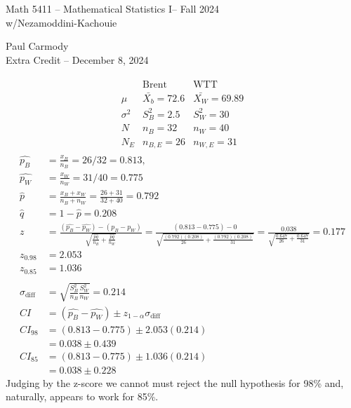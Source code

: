 \documentclass[10pt,a4paper]{report}
\newcommand{\CLASSNAME}{Math 5411 -- Mathematical Statistics I}
\newcommand{\PROFESSOR}{Nezamoddini-Kachouie}
\newcommand{\STUDENTNAME}{Paul Carmody}
\newcommand{\ASSIGNMENT}{Extra Credit }
\newcommand{\DUEDATE}{December 8, 2024}
\newcommand{\SEMESTER}{Fall 2024}
\begin{document}
\begin{center}
	\Large{\CLASSNAME -- \SEMESTER} \\
	\large{w/\PROFESSOR}
\end{center}
\begin{center}
	\STUDENTNAME \\
	\ASSIGNMENT -- \DUEDATE\\
\end{center}

\begin{align*}
	\begin{array}{l|c|c}
	& \text{Brent} & \text{WTT} \\
	\mu & \bar{X_b} = 72.6 & \bar{X_W} = 69.89 \\
	\sigma^2 & S_B^2 = 2.5 & S_W^2 = 30 \\
	N & n_B = 32 & n_W = 40 \\
	N_E & n_{B,E} = 26 & n_{W,E} = 31
	\end{array}
\end{align*}\begin{align*}
	\hat{p_B}&=\frac{x_B}{n_B} = 26/32=0.813,\\ \hat{p_W} &= \frac{x_W}{n_W}=31/40=0.775 \\
	\hat{p} &= \frac{x_B+x_W}{n_B+n_W} = \frac{26+31}{32+40} = 0.792\\
	\hat{q} &= 1-\hat{p} = 0.208\\
	z &= \frac{(\hat{p_B}-\hat{p_W})-(p_B-p_W)}{\sqrt{\frac{\hat{p}\hat{q}}{n_B}+\frac{\hat{p}\hat{q}}{n_W}}} = \frac{(0.813-0.775)-0}{\sqrt{\frac{(0.792)(0.208)}{26}+\frac{(0.792)(0.208)}{31}}} = \frac{0.038}{\sqrt{\frac{0.647}{26}+\frac{0.647}{31 }}} = 0.177 \\ 
	z_{0.98} &= 2.053 \\
	z_{0.85} &= 1.036 \\ \\	
	\sigma_{\text{diff}} &= \sqrt{\frac{S_B^2}{n_B}\frac{S_W^2}{n_W}} = 0.214\\
	CI &= (\hat{p_B}-\hat{p_W}) \pm z_{1-\alpha} \sigma_{\text{diff}} \\
	CI_{98}&= (0.813-0.775)\pm 2.053(0.214)\\
		&= 0.038 \pm 0.439 \\
	CI_{85}&= (0.813-0.775)\pm 1.036(0.214)\\
		&= 0.038 \pm 0.228
\end{align*}Judging by the z-score we cannot must reject the null hypothesis for 98\% and, naturally, appears to work for 85\%. 
\end{document}
